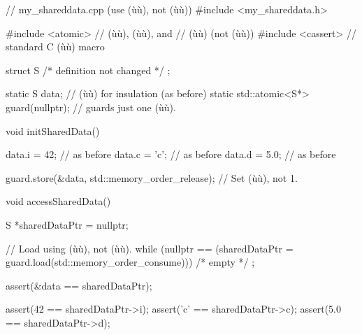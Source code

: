 %
%
%
%
\enlargethispage*{2ex}
\begin{emcppslisting}
// my_shareddata.cpp (use (ù{}ù), not (ù{}ù))
#include <my_shareddata.h>

#include <atomic>  // (ù{}ù), (ù{}ù), and
                   // (ù{}ù) (not (ù{}ù))
#include <cassert> // standard C (ù{}ù) macro

struct S
{
    /* definition not changed */
};

static S               data;           // (ù{}ù) for insulation (as before)
static std::atomic<S*> guard(nullptr); // guards just one (ù{}ù).

void initSharedData()
{
    data.i = 42;   // as before
    data.c = 'c';  // as before
    data.d = 5.0;  // as before

    guard.store(&data, std::memory_order_release);  // Set (ù{}ù), not 1.
}

void accessSharedData()
{
    S *sharedDataPtr = nullptr;

    // Load using (ù{}ù), not (ù{}ù).
    while (nullptr == (sharedDataPtr = guard.load(std::memory_order_consume)))
        /* empty */ ;

    assert(&data == sharedDataPtr);

    assert(42  == sharedDataPtr->i);
    assert('c' == sharedDataPtr->c);
    assert(5.0 == sharedDataPtr->d);
}
\end{emcppslisting}

